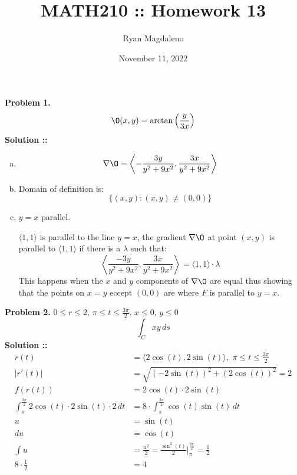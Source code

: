 \documentclass[11pt]{article}
\date{November 11, 2022}
\title{MATH210 :\hspace{2px}: Homework 13}
\author{Ryan Magdaleno}
\begin{document}
\maketitle


\textbf{Problem 1.} 
$$\O (x,y) = \arctan \left(\frac{y}{3x}\right)$$
\vspace{5px}\textbf{Solution ::}
\begin{enumerate}[a)]
\item 
$$\nabla\O = \left\langle-\frac{3y}{y^2+9x^2}, \frac{3x}{y^2+9x^2}\right\rangle$$

\item
Domain of definition is:
$$\{(x,y) : (x,y)\ne (0,0)\}$$

\item $y=x$ parallel.

$\langle1,1\rangle$ is parallel to the line $y=x$, the gradient $\nabla\O$ at
point $(x,y)$ is parallel to $\langle1,1\rangle$ if there is a $\lambda$ such
that:
$$\left\langle\frac{-3y}{y^2+9x^2}, \frac{3x}{y^2+9x^2}\right\rangle
=\langle1,1\rangle\cdot\lambda$$
This happens when the $x$ and $y$ components of $\nabla\O$ are equal thus
showing that the points on $x=y$ eccept $(0,0)$ are where $F$ is parallel to
$y=x$.
\end{enumerate}
\pagebreak


\textbf{Problem 2.}
$0\le r\le 2,\,\pi\le t\le \frac{3\pi}{2},\,x\le 0,\,y\le 0$
$$\int_C xy\,ds$$
\vspace{5px}\textbf{Solution ::}
\begin{align}
    r(t)&=\langle2\cos(t), 2\sin(t)\rangle,\,\,\pi\le t\le \frac{3\pi}{2} \\
    |r'(t)| &= \sqrt{(-2\sin(t))^2 + (2\cos(t))^2} = 2 \\
    f(r(t)) &= 2\cos(t)\cdot 2\sin(t) \\
    \int_{\pi}^{\frac{3\pi}{2}}2\cos(t)\cdot 2\sin(t)\cdot 2\,dt &=
    8\cdot \int_{\pi}^{\frac{3\pi}{2}}\cos(t)\sin(t)\,dt \\
    u &= \sin(t) \\
    du &= \cos (t) \\
    \int u &= \frac{u^2}{2} = \frac{\sin^2(t)}{2}\bigg|^{\frac{3\pi}{2}}_\pi
    = \frac{1}{2} \\
    8\cdot \frac{1}{2} &= 4
\end{align}
\pagebreak
\end{document}
